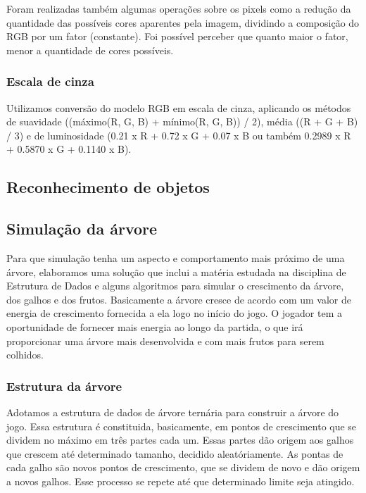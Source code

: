 \documentclass[12pt]{article}
\begin{document}
Foram realizadas tamb\'em algumas opera\c c\~oes sobre os pixels como a redu\c c\~ao da quantidade
das poss\'iveis cores aparentes pela imagem, dividindo a composi\c c\~ao do RGB por um fator (constante).
Foi poss\'ivel perceber que quanto maior o fator, menor a quantidade de cores poss\'iveis.

\subsubsection{Escala de cinza}
Utilizamos convers\~ao do modelo RGB em escala de cinza, aplicando os m\'etodos de suavidade
((m\'aximo(R, G, B) + m\'inimo(R, G, B)) / 2), m\'edia ((R + G + B) / 3) e de luminosidade
(0.21 x R + 0.72 x G + 0.07 x B ou tamb\'em 0.2989 x R + 0.5870 x G + 0.1140 x B).

\subsection{Reconhecimento de objetos}

\subsection{Simula\c c\~ao da \'arvore}
Para que simula\c c\~ao tenha um aspecto e comportamento mais pr\'oximo de uma \'arvore, elaboramos uma solu\c c\~ao que inclui
a mat\'eria estudada na disciplina de Estrutura de Dados e alguns algoritmos para simular o crescimento da \'arvore,
dos galhos e dos frutos. Basicamente a \'arvore cresce de acordo com um valor de energia de crescimento fornecida
a ela logo no in\'icio do jogo. O jogador tem a oportunidade de fornecer mais energia ao longo da partida, o que
ir\'a proporcionar uma \'arvore mais desenvolvida e com mais frutos para serem colhidos.

\subsubsection{Estrutura da \'arvore}
Adotamos a estrutura de dados de \'arvore ternária para construir a \'arvore do jogo. Essa estrutura \'e constituida, basicamente,
em pontos de crescimento que se dividem no m\'aximo em tr\^es partes cada um. Essas partes d\~ao origem aos galhos que crescem at\'e
determinado tamanho, decidido aleat\'oriamente. As pontas de cada galho s\~ao novos pontos de crescimento,
que se dividem de novo e d\~ao origem a novos galhos. Esse processo se repete at\'e que determinado limite seja atingido.
\end{document}
